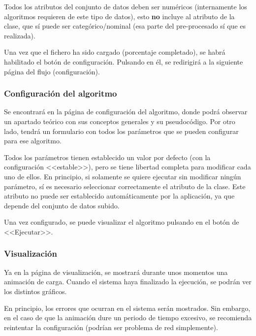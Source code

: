 \begin{tcolorbox}[colback=red!5!white,colframe=red!75!black,fontupper=\footnotesize,title=Requisito fundamental]
Todos los atributos del conjunto de datos deben ser numéricos (internamente los
algoritmos requieren de este tipo de datos), esto \textbf{no} incluye al
atributo de la clase, que sí puede ser categórico/nominal (esa parte del
pre-procesado sí que es realizada).
\end{tcolorbox}

Una vez que el fichero ha sido cargado (porcentaje completado), se habrá
habilitado el botón de configuración. Pulsando en él, se redirigirá a la
siguiente página del flujo (configuración).

\subsubsection{Configuración del algoritmo}
\label{mu:configuracion}
Se encontrará en la página de configuración del algoritmo, donde podrá observar
un apartado teórico con sus conceptos generales y su pseudocódigo. Por otro
lado, tendrá un formulario con todos los parámetros que se pueden configurar
para ese algoritmo.


Todos los parámetros tienen establecido un valor por defecto (con la
configuración <<estable>>), pero se tiene libertad completa para modificar cada
uno de ellos. En principio, si solamente se quiere ejecutar sin modificar ningún
parámetro, sí es necesario seleccionar correctamente el atributo de la clase.
Este atributo no puede ser establecido automáticamente por la aplicación, ya que
depende del conjunto de datos subido. 

Una vez configurado, se puede visualizar el algoritmo pulsando en el botón de
<<Ejecutar>>.

\subsubsection{Visualización}
\label{mu:visualizacion}
Ya en la página de visualización, se mostrará durante unos momentos una
animación de carga. Cuando el sistema haya finalizado la ejecución, se podrán
ver los distintos gráficos.

En principio, los errores que ocurran en el sistema serán mostrados. Sin
embargo, en el caso de que la animación dure un periodo de tiempo excesivo, se
recomienda reintentar la configuración (podrían ser problema de red
simplemente).

